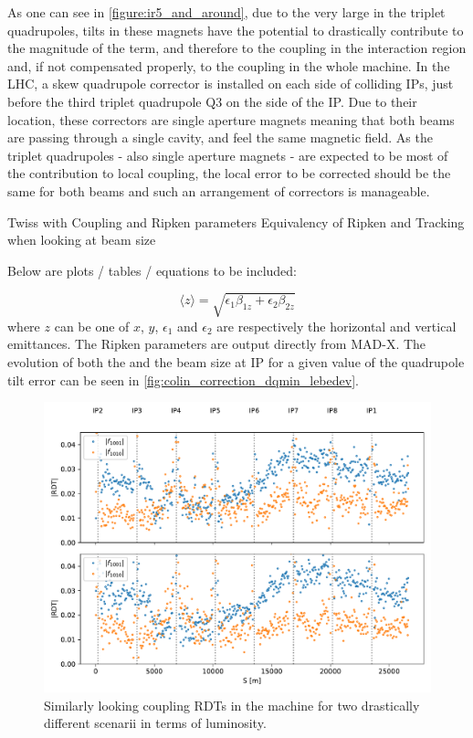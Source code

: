 As one can see in \cref{figure:ir5_and_around}, due to the very large \betafunctions in the triplet quadrupoles, tilts in these magnets have the potential to drastically contribute to the magnitude of the \foneohone term, and therefore to the coupling in the interaction region and, if not compensated properly, to the coupling in the whole machine.
In the LHC, a skew quadrupole corrector is installed on each side of colliding IPs, just before the third triplet quadrupole \(\mathrm{Q3}\) on the side of the IP.
Due to their location, these correctors are single aperture magnets meaning that both beams are passing through a single cavity, and feel the same magnetic field.
As the triplet quadrupoles - also single aperture magnets - are expected to be most of the contribution to local coupling, the local error to be corrected should be the same for both beams and such an arrangement of correctors is manageable.


Twiss with Coupling and Ripken parameters
Equivalency of Ripken and Tracking when looking at beam size

Below are plots / tables / equations to be included:

\begin{equation}
    \langle z \rangle = \sqrt{\epsilon_{1} \beta_{1z} + \epsilon_{2} \beta_{2z}}
    \label{eq:lebedev_beam_size}
\end{equation}
where $z$ can be one of $x$, $y$, $\epsilon_{1}$ and $\epsilon_{2}$ are respectively the horizontal and vertical emittances.
The Ripken parameters are output directly from MAD-X.
The evolution of both the \AbsCminus and the beam size at IP for a given value of the quadrupole tilt error can be seen in \cref{fig:colin_correction_dqmin_lebedev}.

\begin{figure}
    \centering
    \includegraphics*[width=0.9\linewidth]{Figures/Chapter4/guess_rdts.pdf}
    \caption{Similarly looking coupling RDTs in the machine for two drastically different scenarii in terms of luminosity.}
    \label{figure:guess_rdts}
\end{figure}

